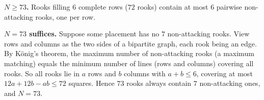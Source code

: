 \textbf{$N\ge73$.} Rooks filling $6$ complete rows ($72$ rooks) contain at most $6$ pairwise non-attacking rooks, one per row.

\textbf{$N=73$ suffices.} Suppose some placement has no $7$ non-attacking rooks. View rows and columns as the two sides of a bipartite graph, each rook being an edge. By K\"onig's theorem, the maximum number of non-attacking rooks (a maximum matching) equals the minimum number of lines (rows and columns) covering all rooks. So all rooks lie in $a$ rows and $b$ columns with $a+b\le6$, covering at most $12a+12b-ab\le72$ squares. Hence $73$ rooks always contain $7$ non-attacking ones, and $N=\boxed{73}$.
